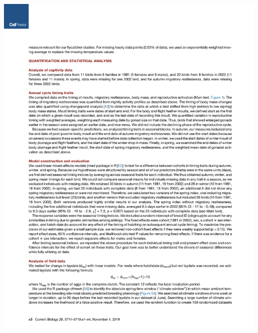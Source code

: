 \documentclass[a4paper, twoside]{templates/ociamthesis}
\begin{document}
\begin{center}\includegraphics[width=1\linewidth]{pdf_chapters/pied/pied_crop_Part09} \end{center}
\end{document}
